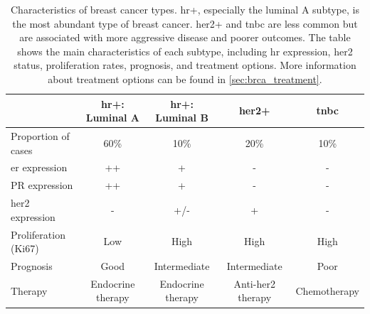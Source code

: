 \begin{table}[ht]
    \begin{tabular}{lcccc}
        \hline
                                        & \gls{hr+}: Luminal A & \gls{hr+}:
        Luminal B
                                        &
        \gls{her2+}
                                        & \gls{tnbc}
        \\ \hline
        Proportion of cases             & 60\%                 & 10\%
                                        &
        20\%
                                        & 10\%
        \\
        \gls{er}\textalpha{} expression & ++                   & +
                                        & -
                                        & -
        \\
        PR expression                   & ++                   & +
                                        & -
                                        & -
        \\
        \gls{her2} expression           & -                    & +/-
                                        & +
                                        & -
        \\
        Proliferation (Ki67)            & Low                  & High
                                        &
        High
                                        & High
        \\
        Prognosis                       & Good                 & Intermediate
                                        &
        Intermediate
                                        & Poor
        \\
        Therapy                         & Endocrine therapy    & Endocrine
        therapy
                                        &
        Anti-\gls{her2}
        therapy                         & Chemotherapy
        \\ \hline
    \end{tabular}
    \caption{Characteristics of breast cancer
        types\supercite{clusan_basic_2023}.
        \Gls{hr+}, especially the luminal A subtype, is the most
        abundant type of breast cancer.
        \Gls{her2+} and \gls{tnbc} are less common
        but are associated with more aggressive disease and poorer outcomes.
        The table shows the main characteristics of each subtype, including \gls{hr}
        expression, \gls{her2} status, proliferation rates, prognosis, and treatment
        options.
        More information about treatment options can be found in
        \cref{sec:brca_treatment}.
    }
    \label{tab:brca_subtypes}
\end{table}

